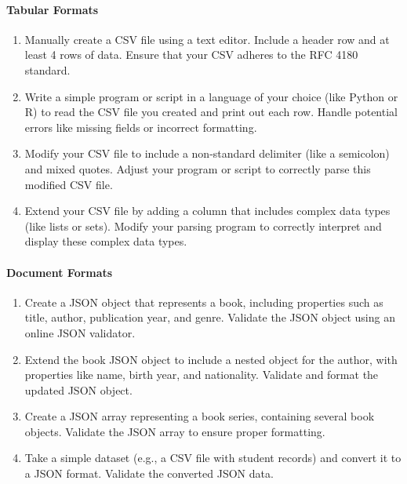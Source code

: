 \paragraph*{Tabular Formats}
\begin{enumerate}
    \item Manually create a CSV file using a text editor. Include a header row and at least 4 rows of data. Ensure that your CSV adheres to the RFC 4180 standard.
    \item Write a simple program or script in a language of your choice (like Python or R) to read the CSV file you created and print out each row. Handle potential errors like missing fields or incorrect formatting.
    \item Modify your CSV file to include a non-standard delimiter (like a semicolon) and mixed quotes. Adjust your program or script to correctly parse this modified CSV file.
    \item Extend your CSV file by adding a column that includes complex data types (like lists or sets). Modify your parsing program to correctly interpret and display these complex data types.
\end{enumerate}
\begin{samepage}
\paragraph*{Document Formats}
\begin{enumerate}
    \item Create a JSON object that represents a book, including properties such as title, author, publication year, and genre. Validate the JSON object using an online JSON validator.
    \item Extend the book JSON object to include a nested object for the author, with properties like name, birth year, and nationality. Validate and format the updated JSON object.
    \item Create a JSON array representing a book series, containing several book objects. Validate the JSON array to ensure proper formatting.
    \item Take a simple dataset (e.g., a CSV file with student records) and convert it to a JSON format. Validate the converted JSON data.
\end{enumerate}
\end{samepage}
